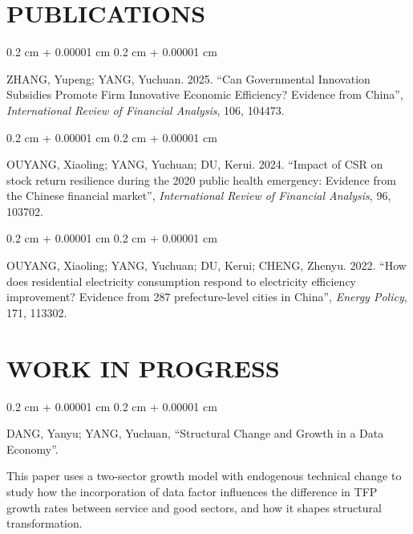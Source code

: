 \documentclass[10pt, letterpaper]{article}
\newenvironment{onecolentry}{
    \begin{adjustwidth}{
        0.2 cm + 0.00001 cm
    }{
        0.2 cm + 0.00001 cm
    }
}{
    \end{adjustwidth}
} %
\newenvironment{paper}{\vspace{.2cm}\begin{samepage}\begin{onecolentry}}{\end{onecolentry}\end{samepage}\vspace{0.2cm}}
\begin{document}
\section{PUBLICATIONS}

\begin{paper}
ZHANG, Yupeng; YANG, Yuchuan. 2025. ``Can Governmental Innovation Subsidies Promote Firm Innovative Economic Efficiency? Evidence from China'', \textit{International Review of Financial Analysis}, 106, 104473.
\end{paper}

\begin{paper}
OUYANG, Xiaoling; YANG, Yuchuan; DU, Kerui. 2024. ``Impact of CSR on stock return resilience during the 2020 public health emergency: Evidence from the Chinese financial market'', \textit{International Review of Financial Analysis}, 96, 103702.
\end{paper}

\begin{paper}
OUYANG, Xiaoling; YANG, Yuchuan; DU, Kerui; CHENG, Zhenyu. 2022. ``How does residential electricity consumption respond to electricity efficiency improvement? Evidence from 287 prefecture-level cities in China'', \textit{Energy Policy}, 171, 113302.
\end{paper}



\section{WORK IN PROGRESS}

\begin{paper}
DANG, Yanyu; YANG, Yuchuan, ``Structural Change and Growth in a Data Economy''.

\hspace{1em}
This paper uses a two-sector growth model with endogenous technical change to study how the incorporation of data factor influences the difference in TFP growth rates between service and good sectors, and how it shapes structural transformation.
\end{paper}

%	
\end{document}
